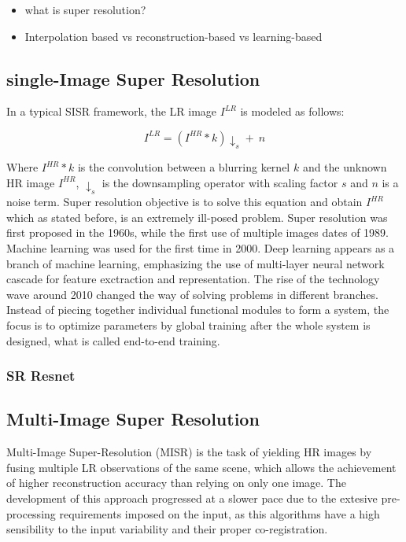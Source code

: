     

\begin{itemize}
    \item what is super resolution?
    \item Interpolation based vs reconstruction-based vs learning-based
\end{itemize}

    \subsection{single-Image Super Resolution}

        In a typical SISR framework, the LR image $I^{LR}$ is modeled as follows:
    
        \begin{equation}
            I^{LR} = ( I^{HR} \ast k) \downarrow_s + \ n
        \end{equation}
    
        Where $I^{HR} \ast k$ is the convolution between a blurring kernel $k$ and the unknown  HR image  $I^{HR}$, $\downarrow_s$ is the downsampling operator with scaling factor $s$ and $n$ is a noise term. Super resolution objective is to solve this equation and obtain $I^{HR}$ which as stated before, is an extremely ill-posed problem. Super resolution was first proposed in the 1960s, while the first use of multiple images dates of 1989. Machine learning was used for the first time in 2000. Deep learning appears as a branch of machine learning, emphasizing the use of multi-layer neural network cascade for feature exctraction and representation. The rise of the technology wave around 2010 changed the way of solving problems in different branches. Instead of piecing together individual functional modules to form a system, the focus is to optimize parameters by global training after the whole system is designed, what is called end-to-end training. 
        \subsubsection{SR Resnet}
    \subsection{Multi-Image Super Resolution}

        Multi-Image Super-Resolution (MISR) is the task of yielding HR images by fusing multiple LR observations of the same scene, which allows the achievement of higher reconstruction accuracy than relying on only one image. The development of this approach progressed at a slower pace due to the extesive pre-processing requirements imposed on the input, as this algorithms have a high sensibility to the input variability and their proper co-registration.  

